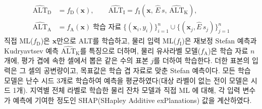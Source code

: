 \begin{equation}
\begin{aligned}
\widehat{\mathrm{ALT}}_{\mathrm{D}} &= f_{\mathrm{D}}(\mathbf{x}), \qquad
\widehat{\mathrm{ALT}}_{\mathrm{I}} = f_{\mathrm{I}}\!\left(\mathbf{x},\, \hat{E}\,s,\, \widehat{\mathrm{ALT}}_{\mathrm{K}}\right), \\
\widehat{\mathrm{ALT}}_{\mathrm{A}} &= f_{\mathrm{A}}(\mathbf{x}) \;\text{학습 자료}\; \{(\mathbf{x}_i, y_i)\}_{i=1}^{n} \cup \{(\mathbf{x}_j, \hat{E}\,s_j)\}_{j=1}^{n}
\end{aligned}
\label{eq:alt}
\end{equation}
직접 ML($f_{\mathrm{D}}$)은 $\mathbf{x}$만으로 ALT를 학습하고, 물리 입력 ML($f_{\mathrm{I}}$)은 재보정 Stefan 예측과 Kudryavtsev\cite{Kudryavtsev1974} 예측 $\widehat{\mathrm{ALT}}_{\mathrm{K}}$를 특징으로 더하며, 물리 유사라벨 모델($f_{\mathrm{A}}$)은 학습 자료 $n$개에, 평가 겹에 속한 셀에서 뽑은 같은 수의 표본 $j$를 더하여 학습한다. 더한 표본의 입력은 그 셀의 공변량이고, 목표값은 학습 겹 자료로 맞춘 Stefan 예측이다. 모든 학습 모델은 난수 시드 3개로 학습하여 예측을 평균하였다(대상 라벨이 없는 전이 모델은 시드 1개). 지역별 전체 라벨로 학습한 물리 잔차 모델과 직접 ML 에 대해, 각 입력 변수가 예측에 기여한 정도인 SHAP(SHapley Additive exPlanations) 값\cite{Lundberg2017}을 계산하였다.


